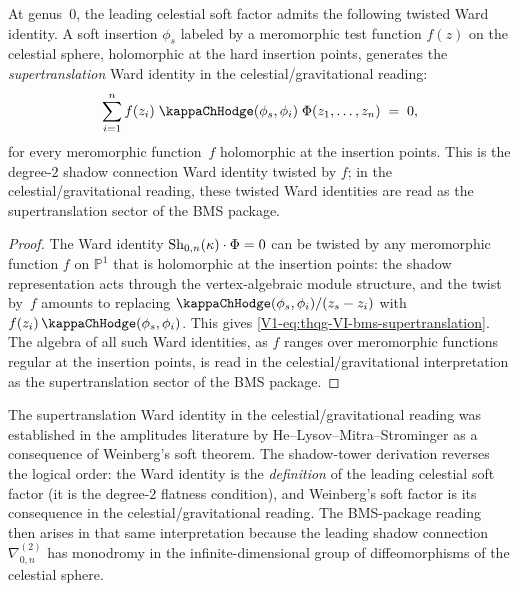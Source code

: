 \begin{corollary}
\label{cor:thqg-VI-bms-supertranslation}
At genus~$0$, the leading celestial soft factor admits the following
twisted Ward identity. A soft insertion $\phi_s$ labeled by a
meromorphic test function $f(z)$ on the celestial sphere, holomorphic
at the hard insertion points, generates the \emph{supertranslation} Ward
identity in the celestial/gravitational reading:
\begin{equation}%
\sum_{i=1}^{n} f(z_i)\;\kappaChHodge(\phi_s, \phi_i)\;
\Phi(z_1, \dotsc, z_n)
\;=\; 0,
\end{equation}
for every meromorphic function~$f$ holomorphic at the insertion
points. This is the degree-$2$ shadow
connection Ward identity twisted by $f$; in the
celestial/gravitational reading, these twisted Ward identities are
read as the supertranslation sector of the BMS package.
\end{corollary}

\begin{proof}
The Ward identity $\operatorname{Sh}_{0,n}(\kappa) \cdot \Phi = 0$ can be
twisted by any meromorphic function $f$ on $\mathbb{P}^1$ that is
holomorphic at the insertion points:
the shadow representation acts through the vertex-algebraic
module structure, and the twist by~$f$ amounts to replacing
$\kappaChHodge(\phi_s, \phi_i)/(z_s - z_i)$ with
$f(z_i)\,\kappaChHodge(\phi_s, \phi_i)$. This gives
\eqref{V1-eq:thqg-VI-bms-supertranslation}. The algebra of all
such Ward identities, as $f$ ranges over meromorphic functions
regular at the insertion points, is read in the
celestial/gravitational interpretation as the supertranslation
sector of the BMS package.
\end{proof}

\begin{remark}
The supertranslation Ward identity in the celestial/gravitational
reading was established in the amplitudes literature by
He--Lysov--Mitra--Strominger \cite{HMPS15} as a consequence of
Weinberg's soft theorem.
The shadow-tower derivation reverses the logical order:
the Ward identity is the \emph{definition} of the leading
celestial soft factor (it is the degree-$2$ flatness condition), and
Weinberg's soft factor is its consequence in the
celestial/gravitational reading. The BMS-package
reading then arises in that same interpretation because the leading shadow connection
$\nabla^{(2)}_{0,n}$ has monodromy in the infinite-dimensional
group of diffeomorphisms of the celestial sphere.
\end{remark}

